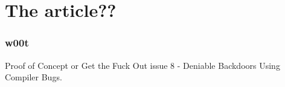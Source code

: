\section{The article??}

\begin{frame}
  \frametitle{w00t}
%
Proof of Concept or Get the Fuck Out issue 8 - Deniable
Backdoors Using Compiler Bugs.
%
\end{frame}
